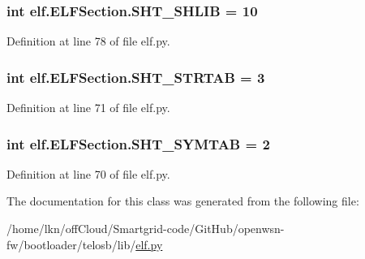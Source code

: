 \subsubsection[{\texorpdfstring{S\+H\+T\+\_\+\+S\+H\+L\+IB}{SHT_SHLIB}}]{\setlength{\rightskip}{0pt plus 5cm}int elf.\+E\+L\+F\+Section.\+S\+H\+T\+\_\+\+S\+H\+L\+IB = 10\hspace{0.3cm}{\ttfamily [static]}}\hypertarget{clasself_1_1_e_l_f_section_a40a76356ebec62b556c12d975fb0f1ee}{}\label{clasself_1_1_e_l_f_section_a40a76356ebec62b556c12d975fb0f1ee}


Definition at line 78 of file elf.\+py.

\subsubsection[{\texorpdfstring{S\+H\+T\+\_\+\+S\+T\+R\+T\+AB}{SHT_STRTAB}}]{\setlength{\rightskip}{0pt plus 5cm}int elf.\+E\+L\+F\+Section.\+S\+H\+T\+\_\+\+S\+T\+R\+T\+AB = 3\hspace{0.3cm}{\ttfamily [static]}}\hypertarget{clasself_1_1_e_l_f_section_a5db587e78334ddf189c910f5f3dea9e3}{}\label{clasself_1_1_e_l_f_section_a5db587e78334ddf189c910f5f3dea9e3}


Definition at line 71 of file elf.\+py.

\subsubsection[{\texorpdfstring{S\+H\+T\+\_\+\+S\+Y\+M\+T\+AB}{SHT_SYMTAB}}]{\setlength{\rightskip}{0pt plus 5cm}int elf.\+E\+L\+F\+Section.\+S\+H\+T\+\_\+\+S\+Y\+M\+T\+AB = 2\hspace{0.3cm}{\ttfamily [static]}}\hypertarget{clasself_1_1_e_l_f_section_a70f48a0242a169c9450ecea6c543620e}{}\label{clasself_1_1_e_l_f_section_a70f48a0242a169c9450ecea6c543620e}


Definition at line 70 of file elf.\+py.



The documentation for this class was generated from the following file\+:\begin{DoxyCompactItemize}
\item 
/home/lkn/off\+Cloud/\+Smartgrid-\/code/\+Git\+Hub/openwsn-\/fw/bootloader/telosb/lib/\hyperlink{elf_8py}{elf.\+py}\end{DoxyCompactItemize}

